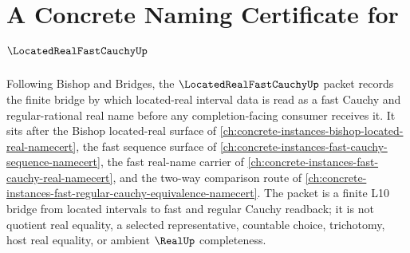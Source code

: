\chapter{A Concrete Naming Certificate for $\LocatedRealFastCauchyUp$}
\label{ch:concrete-instances-located-real-fast-cauchy-namecert}

Following Bishop and Bridges, the $\LocatedRealFastCauchyUp$ packet records the finite bridge by which located-real interval data is read as a fast Cauchy and regular-rational real name before any completion-facing consumer receives it. It sits after the Bishop located-real surface of \autoref{ch:concrete-instances-bishop-located-real-namecert}, the fast sequence surface of \autoref{ch:concrete-instances-fast-cauchy-sequence-namecert}, the fast real-name carrier of \autoref{ch:concrete-instances-fast-cauchy-real-namecert}, and the two-way comparison route of \autoref{ch:concrete-instances-fast-regular-cauchy-equivalence-namecert}. The packet is a finite L10 bridge from located intervals to fast and regular Cauchy readback; it is not quotient real equality, a selected representative, countable choice, trichotomy, host real equality, or ambient $\RealUp$ completeness.

